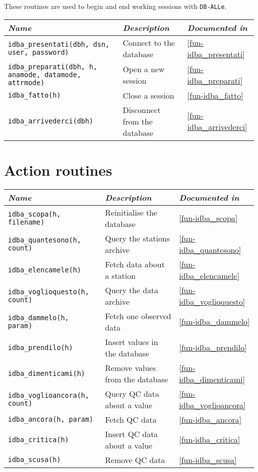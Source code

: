 \documentclass[draft,12pt,a4paper,twoside]{book}
\newcommand{\dballe}{{\tt DB-ALLe}}
\begin{document}
These routines are used to begin and end working sessions with \dballe{}.

\begin{tabular}{|l|l|l|}
\hline
{\em Name} & {\em Description} & {\em Documented in} \\
\hline
{\tt idba\_presentati(dbh, dsn, user, password)} & Connect to the database & \ref{fun-idba_presentati} \\
{\tt idba\_preparati(dbh, h, anamode, datamode, attrmode)} & Open a new session & \ref{fun-idba_preparati} \\
{\tt idba\_fatto(h)}                        & Close a session              & \ref{fun-idba_fatto} \\
{\tt idba\_arrivederci(dbh)}                & Disconnect from the database & \ref{fun-idba_arrivederci} \\
\hline
\end{tabular}


\section{Action routines}

\begin{tabular}{|l|l|l|}
\hline
{\em Name} & {\em Description} & {\em Documented in} \\
\hline
{\tt idba\_scopa(h, filename)}     & Reinitialise the database       & \ref{fun-idba_scopa} \\
{\tt idba\_quantesono(h, count)}   & Query the stations archive      & \ref{fun-idba_quantesono} \\
{\tt idba\_elencamele(h)}          & Fetch data about a station      & \ref{fun-idba_elencamele} \\
{\tt idba\_voglioquesto(h, count)} & Query the data archive          & \ref{fun-idba_voglioquesto} \\
{\tt idba\_dammelo(h, param)}      & Fetch one observed data         & \ref{fun-idba_dammelo} \\
{\tt idba\_prendilo(h)}            & Insert values in the database   & \ref{fun-idba_prendilo} \\
{\tt idba\_dimenticami(h)}         & Remove values from the database & \ref{fun-idba_dimenticami} \\
{\tt idba\_voglioancora(h, count)} & Query QC data about a value     & \ref{fun-idba_voglioancora} \\
{\tt idba\_ancora(h, param)}       & Fetch QC data                   & \ref{fun-idba_ancora} \\
{\tt idba\_critica(h)}             & Insert QC data about a value    & \ref{fun-idba_critica} \\
{\tt idba\_scusa(h)}               & Remove QC data                  & \ref{fun-idba_scusa} \\
\hline
\end{tabular}
\end{document}
